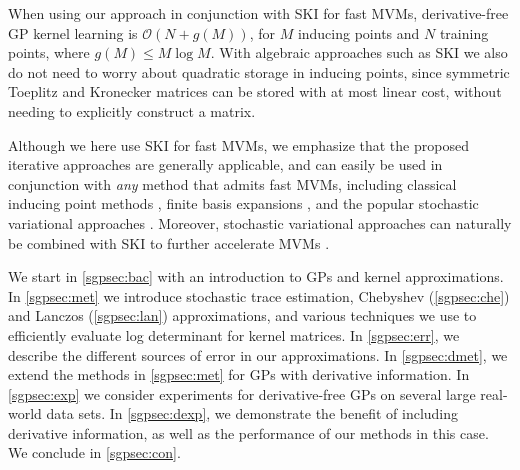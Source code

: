 When using our approach in conjunction with SKI \citep{wilson2015kernel} for
fast MVMs, derivative\hyp{}free GP kernel learning is $\mathcal{O}(N + g(M))$,
for $M$ inducing points and $N$ training points, where $g(M) \leq M \log M$.
With algebraic approaches such as SKI we also do not need to worry about
quadratic storage in inducing points, since symmetric Toeplitz and Kronecker
matrices can be stored with at most linear cost, without needing to explicitly
construct a matrix.

Although we here use SKI for fast MVMs, we emphasize that the proposed iterative
approaches are generally applicable, and can easily be used in conjunction with
\emph{any} method that admits fast MVMs, including classical inducing point
methods \citep{quinonero2005unifying}, finite basis expansions 
\citep{le2013fastfood}, and the popular stochastic variational approaches 
\citep{hensman2013uai}. Moreover, stochastic variational approaches can
naturally be combined with SKI to further accelerate MVMs 
\citep{wilson2016stochastic}.

We start in \cref{sgpsec:bac} with an introduction to GPs and kernel
approximations.  In \cref{sgpsec:met} we introduce stochastic trace
estimation, Chebyshev (\cref{sgpsec:che}) and Lanczos (\cref{sgpsec:lan})
approximations, and various techniques we use to efficiently evaluate log
determinant for kernel matrices. In \cref{sgpsec:err}, we describe the
different sources of error in our approximations. In \cref{sgpsec:dmet}, we
extend the methods in \cref{sgpsec:met} for GPs with derivative information. In
\cref{sgpsec:exp} we consider experiments for derivative\hyp{}free GPs on
several large real\hyp{}world data sets. In \cref{sgpsec:dexp}, we demonstrate
the benefit of including derivative information, as well as the performance of
our methods in this case. We conclude in \cref{sgpsec:con}.